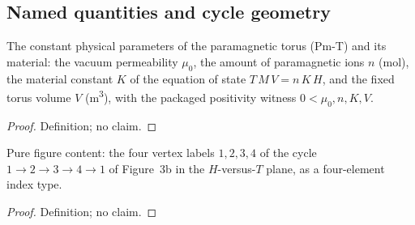
\subsection*{Named quantities and cycle geometry}

\begin{definition}
\label{def:IPhO2026Problems_problem_IPhO_2026_3_C_2:TorusParams}
The constant physical parameters of the paramagnetic torus (Pm-T) and
its material: the vacuum permeability $\mu_0$, the amount of
paramagnetic ions $n$ (mol), the material constant $K$ of the equation
of state $T\,M\,V = n\,K\,H$, and the fixed torus volume $V$
(m\textsuperscript{3}), with the packaged positivity witness
$0 < \mu_0, n, K, V$.
\end{definition}
\begin{proof}
Definition; no claim.
\end{proof}

\begin{definition}
\label{def:IPhO2026Problems_problem_IPhO_2026_3_C_2:Vertex}
Pure figure content: the four vertex labels $1, 2, 3, 4$ of the cycle
$1 \to 2 \to 3 \to 4 \to 1$ of Figure~3b in the $H$-versus-$T$ plane,
as a four-element index type.
\end{definition}
\begin{proof}
Definition; no claim.
\end{proof}


